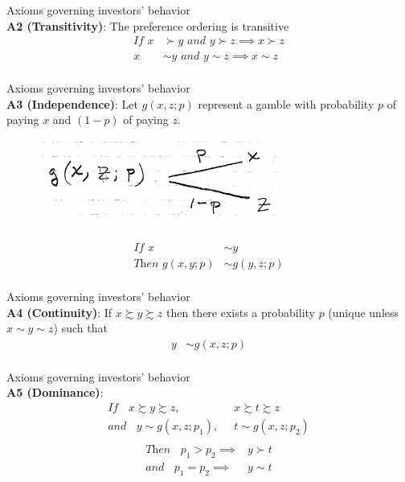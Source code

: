 \documentclass[
14pt,notheorems,hyperref={pdfauthor=whatever}
]{beamer}
\begin{document}
\begin{frame}
Axioms governing investors' behavior\\
\hfill \break
\textbf{A2 (Transitivity)}: The preference ordering is transitive\\
\hfill \break
\begin{align*}
    \textit{If }x &\succ y \textit{ and } y \succ z \implies x \succ z\\
    x &\sim y \textit{ and } y \sim z \implies x \sim z\\
\end{align*}
\end{frame}

\begin{frame}
Axioms governing investors' behavior\\
\hfill \break
\textbf{A3 (Independence)}: Let $g(x,z;p)$ represent a gamble with probability $p$ of paying $x$ and $(1-p)$ of paying $z$.\\
\begin{figure}[gamble]
    \includegraphics[width=0.7\textwidth]{L2-gamble}
    \centering
\end{figure}
\begin{align*}
    \textit{If }x &\sim y\\
    \textit{Then }g(x,y;p) &\sim g(y,z;p)\\
\end{align*}
\end{frame}

\begin{frame}
Axioms governing investors' behavior\\
\hfill \break
\textbf{A4 (Continuity)}: If $x \succsim y \succsim z$ then there exists a probability $p$ (unique unless $x \sim y \sim z$) such that\\
\hfill \break
\begin{align*}
    y &\sim g(x,z;p)\\
\end{align*}
\end{frame}

\begin{frame}
Axioms governing investors' behavior\\
\hfill \break
\textbf{A5 (Dominance)}:
\begin{align*}
    \textit{If }\;\;x \succsim y \succsim z,&\;\; x \succsim t \succsim z\\
    \textit{and }\;\;y \sim g(x,z;p_1),&\;\; t \sim g(x,z;p_2)\\
\end{align*}
\begin{align*}
    \textit{Then }\;\;p_1 > p_2 \implies& y \succ t\\
    \textit{and }\;\;p_1 = p_2 \implies& y \sim t\\
\end{align*}
\end{frame}
\end{document}
